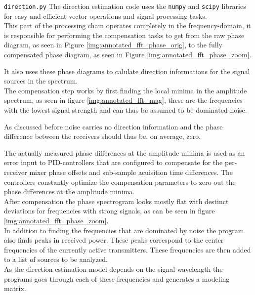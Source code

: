 \begin{subchapter}{\texttt{direction.py}}
  The direction estimation code uses the \texttt{numpy} and
  \texttt{scipy} libraries for easy and efficient
  vector operations and signal processing tasks. \\

  This part of the processing chain operates completely
  in the frequency-domain, it is responsible for
  performing the compensation tasks to get from the
  raw phase diagram, as seen in Figure \ref{img:annotated_fft_phase_orig},
  to the fully compensated phase diagram,
  as seen in Figure \ref{img:annotated_fft_phase_zoom}.

  It also uses these phase diagrams to calulate direction informations
  for the signal sources in the spectrum. \\

  The compensation step works by first finding the local minima in
  the amplitude spectrum, as seen in figure \ref{img:annotated_fft_mag},
  these are the frequencies with the lowest signal strength
  and can thus be assumed to be dominated noise.

  As discussed before noise carries no direction
  information and the phase difference between the
  receivers should thus be, on average, zero.

  The actually measured phase differences at the amplitude minima
  is used as an error input to PID-controllers that
  are configured to compensate for the per-receiver
  mixer phase offsets and sub-sample acuisition
  time differences.
  The controllers constantly optimize the compensation
  parameters to zero out the phase differences at the
  amplitude minima. \\

  After compensation the phase spectrogram looks mostly
  flat with destinct deviations for frequencies
  with strong signals, as can be seen in
  figure \ref{img:annotated_fft_phase_zoom}. \\

  In addition to finding the frequencies that are dominated
  by noise the program also finds peaks in received power.
  These peaks correspond to the center frequencies of the currently active
  transmitters.
  These frequencies are then added to a list of sources to be
  analyzed. \\

  As the direction estimation model depends on the
  signal wavelength the programs goes through each of
  these frequencies and generates a modeling matrix. \\


\end{subchapter}
